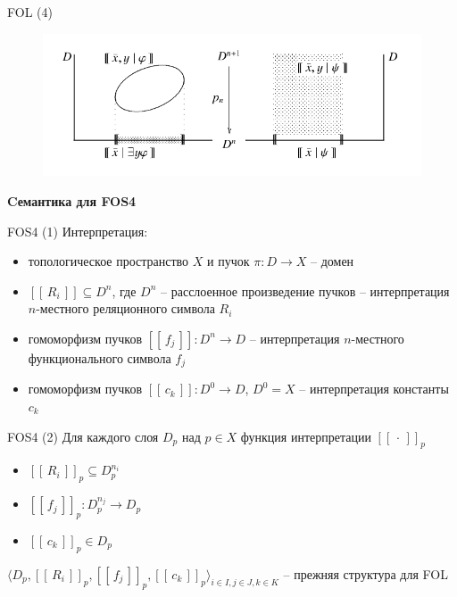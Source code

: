 \documentclass{beamer}
\begin{document}
\begin{frame}{FOL (4)}
\begin{center}
	\begin{figure}[H]
		\includegraphics[scale=0.45]{fol.png} 
	\end{figure}
\end{center}
\end{frame}



\begin{frame}{}
\begin{center}
	\textbf{Cемантика для FOS4}
\end{center}
\end{frame}

\begin{frame}{FOS4 (1)}
Интерпретация:\\
\medskip
{\small
\begin{itemize}
	\item топологическое пространство $X$ и пучок $\pi : D \to X$ -- домен
	\item $[ \! [ \, R_i \, ] \! ] \subseteq D^n$, где $D^n$ -- расслоенное произведение пучков -- интерпретация $n$-местного реляционного символа $R_i$
	\item гомоморфизм пучков $[ \! [ \, f_j \, ] \! ] : D^n \to D$ -- интерпретация $n$-местного функционального символа $f_j$ 
	\item гомоморфизм пучков $[ \! [ \, c_k \, ] \! ] : D^0 \to D$, $D^0 = X$ -- интерпретация константы $c_k$
\end{itemize}
}
\end{frame}

\begin{frame}{FOS4 (2)}
Для каждого слоя $D_p$ над $p \in X$ функция интерпретации $[ \! [ \, \cdot \, ] \! ]_p$\\
\medskip
{\small
\begin{itemize}
	\item $[ \! [ \, R_i \, ] \! ]_p \subseteq D_p^{n_i}$
	\item $[ \! [ \, f_j \, ] \! ]_p : D_p^{n_j} \to D_p$
	\item $[ \! [ \, c_k \, ] \! ]_p \in D_p$
\end{itemize}
}
\medskip
{\small $\langle D_p, [ \! [ \, R_i \, ] \! ]_p, [ \! [ \, f_j \, ] \! ]_p, [ \! [ \, c_k \, ] \! ]_p \rangle_{i \in I, j \in J, k \in K}$ -- прежняя структура для FOL}
\end{frame}
\end{document}

